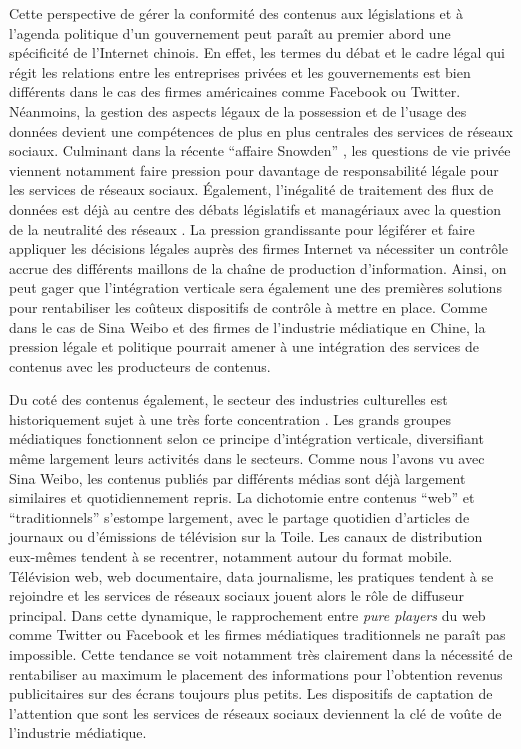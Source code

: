 Cette perspective de gérer la conformité des contenus aux législations et à l'agenda politique d'un gouvernement peut paraît au premier abord une spécificité de l'Internet chinois. En effet, les termes du débat et le cadre légal qui régit les relations entre les entreprises privées et les gouvernements est bien différents dans le cas des firmes américaines comme Facebook ou Twitter. Néanmoins, la gestion des aspects légaux de la possession et de l'usage des données devient une compétences de plus en plus centrales des services de réseaux sociaux. Culminant dans la récente ``affaire Snowden'' \cite{Greenwald2013}, les questions de vie privée viennent notamment faire pression pour davantage de responsabilité légale pour les services de réseaux sociaux. Également, l'inégalité de traitement des flux de données est déjà au centre des débats législatifs et managériaux avec la question de la neutralité des réseaux \cite{Schafer2011}. La pression grandissante pour légiférer et faire appliquer les décisions légales auprès des firmes Internet va nécessiter un contrôle accrue des différents maillons de la chaîne de production d'information. Ainsi, on peut gager que l'intégration verticale sera également une des premières solutions pour rentabiliser les coûteux dispositifs de contrôle à mettre en place. Comme dans le cas de Sina Weibo et des firmes de l'industrie médiatique en Chine, la pression légale et politique pourrait amener à une intégration des services de contenus avec les producteurs de contenus.

Du coté des contenus également, le secteur des industries culturelles est historiquement sujet à une très forte concentration \cite{Martel2010}. Les grands groupes médiatiques fonctionnent selon ce principe d'intégration verticale, diversifiant même largement leurs activités dans le secteurs. Comme nous l'avons vu avec Sina Weibo, les contenus publiés par différents médias sont déjà largement similaires et quotidiennement repris. La dichotomie entre contenus ``web'' et ``traditionnels'' s'estompe largement, avec le partage quotidien d'articles de journaux ou d'émissions de télévision sur la Toile. Les canaux de distribution eux-mêmes tendent à se recentrer, notamment autour du format mobile. Télévision web,  web documentaire, data journalisme, les pratiques tendent à se rejoindre et les services de réseaux sociaux jouent alors le rôle de diffuseur principal. Dans cette dynamique, le rapprochement entre \textit{pure players} du web comme Twitter ou Facebook et les firmes médiatiques traditionnels ne paraît pas impossible. Cette tendance se voit notamment très clairement dans la nécessité de rentabiliser au maximum le placement des informations pour l'obtention revenus publicitaires sur des écrans toujours plus petits. Les dispositifs de captation de l'attention que sont les services de réseaux sociaux deviennent la clé de voûte de l'industrie médiatique. 

